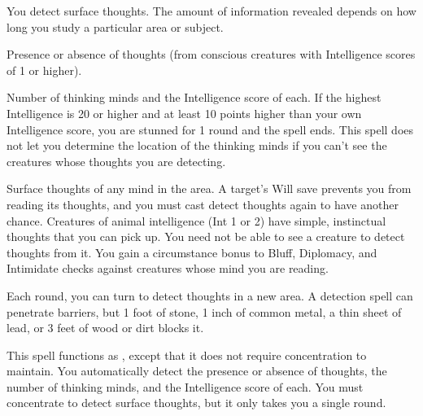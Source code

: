 \begin{spelleffect}
  You detect surface thoughts. The amount of information revealed depends on how long you study a particular area or subject.
  \par {} Presence or absence of thoughts (from conscious creatures with Intelligence scores of 1 or higher).
  \par {} Number of thinking minds and the Intelligence score of each. If the highest Intelligence is 20 or higher and at least 10 points higher than your own Intelligence score, you are stunned for 1 round and the spell ends. This spell does not let you determine the location of the thinking minds if you can't see the creatures whose thoughts you are detecting.
  \par {} Surface thoughts of any mind in the area. A target's Will save prevents you from reading its thoughts, and you must cast detect thoughts again to have another chance. Creatures of animal intelligence (Int 1 or 2) have simple, instinctual thoughts that you can pick up. You need not be able to see a creature to detect thoughts from it. You gain a  circumstance bonus to Bluff, Diplomacy, and Intimidate checks against creatures whose mind you are reading.
\end{spelleffect}
\begin{spellnotes}
  Each round, you can turn to detect thoughts in a new area. A detection spell can penetrate barriers, but 1 foot of stone, 1 inch of common metal, a thin sheet of lead, or 3 feet of wood or dirt blocks it.
\end{spellnotes}

\begin{spelleffect}
  This spell functions as , except that it does not require concentration to maintain. You automatically detect the presence or absence of thoughts, the number of thinking minds, and the Intelligence score of each. You must concentrate to detect surface thoughts, but it only takes you a single round. 
\end{spelleffect}

